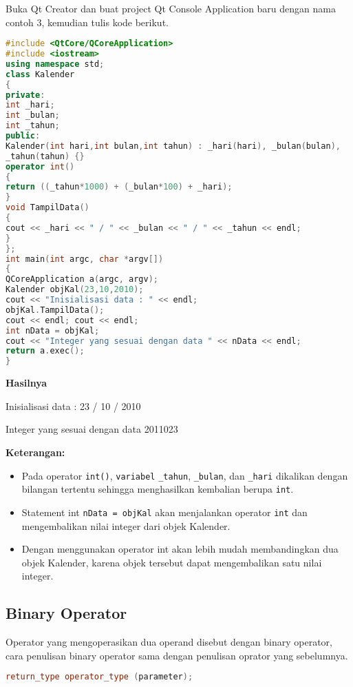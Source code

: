 Buka Qt Creator dan buat project Qt Console Application baru dengan nama
contoh 3, kemudian tulis kode berikut.

\begin{lstlisting}[language=c++]
#include <QtCore/QCoreApplication>
#include <iostream>
using namespace std;
class Kalender
{
private:
int _hari;
int _bulan;
int _tahun;
public:
Kalender(int hari,int bulan,int tahun) : _hari(hari), _bulan(bulan),
_tahun(tahun) {}
operator int()
{
return ((_tahun*1000) + (_bulan*100) + _hari);
}
void TampilData()
{
cout << _hari << " / " << _bulan << " / " << _tahun << endl;
}
};
int main(int argc, char *argv[])
{
QCoreApplication a(argc, argv);
Kalender objKal(23,10,2010);
cout << "Inisialisasi data : " << endl;
objKal.TampilData();
cout << endl; cout << endl;
int nData = objKal;
cout << "Integer yang sesuai dengan data " << nData << endl;
return a.exec();
}
\end{lstlisting}

\textbf{Hasilnya}

Inisialisasi data :
23 / 10 / 2010

Integer yang sesuai dengan data 2011023

\textbf{Keterangan:}

\begin{itemize}
\tightlist
\item
  Pada operator \texttt{int()}, \texttt{variabel} \texttt{\_tahun},
  \texttt{\_bulan}, dan \texttt{\_hari} dikalikan dengan bilangan
  tertentu sehingga menghasilkan kembalian berupa \texttt{int}.
\item
  Statement int \texttt{nData\ =\ objKal} akan menjalankan operator
  \texttt{int} dan mengembalikan nilai integer dari objek Kalender.
\item
  Dengan menggunakan operator int akan lebih mudah membandingkan dua
  objek Kalender, karena objek tersebut dapat mengembalikan satu nilai
  integer.
\end{itemize}

\subsection{Binary Operator}\label{binary-operator}

Operator yang mengoperasikan dua operand disebut dengan binary operator,
cara penulisan binary operator sama dengan penulisan oprator yang
sebelumnya.

\begin{lstlisting}[language=c++]
return_type operator_type (parameter);
\end{lstlisting}

